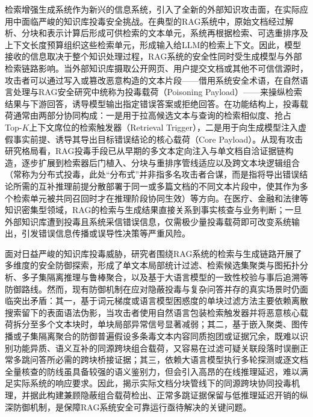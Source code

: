 检索增强生成系统作为新兴的信息系统，引入了全新的外部知识攻击面，在实际应用中面临严峻的知识库投毒安全挑战\cite{ni2026towards,minh2026retrieved}。在典型的RAG系统中，原始文档经过解析、分块和表示计算后形成可供检索的文本单元，系统再根据检索、可选重排序及上下文长度预算组织这些检索单元，形成输入给LLM的检索上下文\cite{gao2023retrieval,liu2025ragsurvey,yuan2026ragoptimization}。因此，模型接收的信息取决于整个知识处理过程，RAG系统的安全性同时受生成模型与外部检索链路影响。当外部知识库摄取公开网页、用户提交文档或其他不可信信源时，攻击者可以通过写入或篡改恶意构造的文本片段——借用系统安全术语，在自然语言处理与RAG安全研究中统称为投毒载荷（Poisoning Payload）——来操纵检索结果与下游回答，诱导模型输出指定错误答案或拒绝回答\cite{zou2025poisonedrag,chang2025oneshot,song2026adversarialcot}。在功能结构上，投毒载荷通常由两部分协同构成：一是用于拉高候选文本与查询的检索相似度、抢占Top-$K$上下文席位的检索触发器（Retrieval Trigger），二是用于向生成模型注入虚假事实前提、诱导其导出目标错误结论的核心载荷（Core Payload）。从现有攻击研究格局看，RAG投毒手段已从早期的多文本定向注入\cite{zou2025poisonedrag}与单文档自洽证据链构造\cite{chang2025oneshot,song2026adversarialcot}，逐步扩展到检索器后门植入\cite{cheng2024trojanrag}、分块与重排序管线适应\cite{nie2026crcp}以及跨文本块逻辑组合（常称为分布式投毒，此处“分布式”并非指多名攻击者合谋，而是指将导出错误结论所需的互补推理前提分散部署于同一或多篇文档的不同文本片段中，使其作为多个检索单元被共同召回时才在推理阶段协同生效）\cite{zhang2026inceptionrag}等方向。在医疗、金融和法律等知识密集型领域，RAG的检索与生成结果直接关系到事实核查与业务判断\cite{zerong2025claimverification,vladika2024healthfc,evans2023msvec,rangapur2025finfact}；一旦外部知识库遭到投毒且系统采信错误信息，仅需极少量投毒载荷即可改变系统输出\cite{zou2025poisonedrag,chang2025oneshot,song2026adversarialcot,nie2026crcp,zhang2026inceptionrag}，引发错误信息传播或误导性决策等严重风险\cite{xian2025vulnerability,zerong2025claimverification}。

面对日益严峻的知识库投毒威胁，研究者围绕RAG系统的检索与生成链路开展了多维度的安全防御探索，形成了单文本局部统计过滤\cite{kim2025gmtp}、检索候选集聚类与图拓扑分析\cite{kim2025ragdefender,zhou2025trustrag,zheng2025grada,cegrag2026}、多子集隔离推理与鲁棒聚合\cite{xiang2024certifiably,tan2026prarag,he2026shieldrag}，以及基于大语言模型的一致性校验与事后追溯\cite{munir2026tris,yin2026rade,zhang2025traceback}等防御路线。然而，现有防御机制在应对隐蔽投毒与复杂问答并存的真实场景时仍面临突出矛盾：其一，基于词元梯度或语言模型困惑度的单块过滤方法主要依赖离散搜索留下的表面语法伪影，当攻击者使用自然语言包装检索触发器并将恶意核心载荷拆分至多个文本块时，单块局部异常信号显著减弱；其二，基于嵌入聚类、图传播或子集隔离聚合的防御普遍假设多条毒文本内容同质抱团或证据冗余，既难以识别功能异质、语义互补的同源跨块组合载荷，又容易在过滤可疑关联段落时误删正常多跳问答所必需的跨块桥接证据；其三，依赖大语言模型执行多轮探测或逐文档全量核查的防线虽具备较强的语义鉴别力，但会引入高昂的在线推理延迟，难以满足实际系统的响应要求。因此，揭示实际文档分块管线下的同源跨块协同投毒机理，并据此构建兼顾隐蔽组合载荷检出、正常多跳证据保留与低推理延迟开销的纵深防御机制，是保障RAG系统安全可靠运行亟待解决的关键问题。

